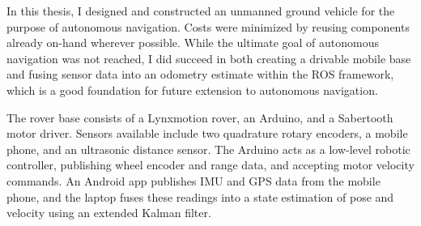 \begin{abstractpage}
In this thesis, I designed and constructed an unmanned ground vehicle for the purpose of autonomous navigation. Costs were minimized by reusing components already on-hand wherever possible. While the ultimate goal of autonomous navigation was not reached, I did succeed in both creating a drivable mobile base and fusing sensor data into an odometry estimate within the ROS framework, which is a good foundation for future extension to autonomous navigation.

The rover base consists of a Lynxmotion rover, an Arduino, and a Sabertooth motor driver. Sensors available include two quadrature rotary encoders, a mobile phone, and an ultrasonic distance sensor. The Arduino acts as a low-level robotic controller, publishing wheel encoder and range data, and accepting motor velocity commands. An Android app publishes IMU and GPS data from the mobile phone, and the laptop fuses these readings into a state estimation of pose and velocity using an extended Kalman filter.
\end{abstractpage}